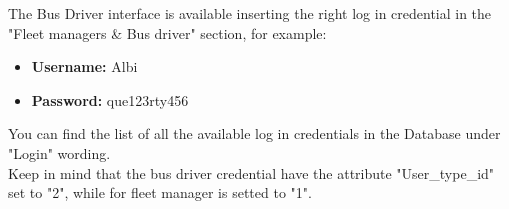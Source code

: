 \documentclass[a4paper, 12pt]{article}
\begin{document}
	The Bus Driver interface is available inserting the right log in credential in the "Fleet managers \& Bus driver" section, for example:
	\begin{itemize}
	       \item \textbf{Username:} Albi
	       \item \textbf{Password:} que123rty456
	\end{itemize}
	You can find the list of all the available log in credentials in the Database under "Login" wording. \\Keep in mind that the bus driver credential have the attribute "User\_type\_id" set to "2", while for fleet manager is setted to "1".
	
	
\end{document}
